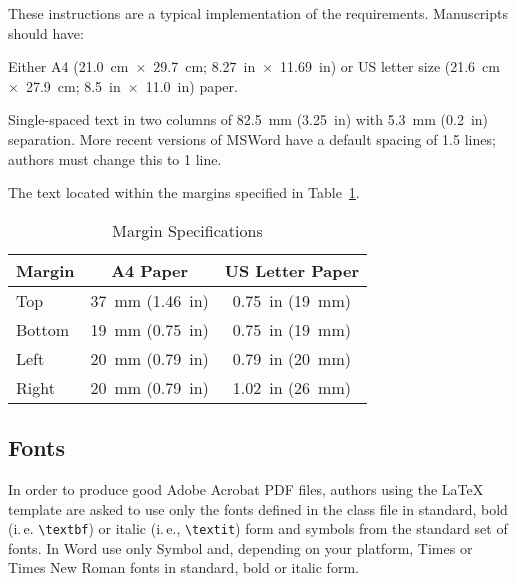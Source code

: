 \documentclass[letterpaper,  %
              ]{jacow-2_3}   %
\begin{document}
{{These instructions are a typical implementation of the
requirements. Manuscripts should have:
\begin{Itemize}
    \item  Either A4 (\SI{21.0}{cm}~$\times$~\SI{29.7}{cm}; \SI{8.27}{in}~$\times$~\SI{11.69}{in}) or US
           letter size (\SI{21.6}{cm}~$\times$~\SI{27.9}{cm}; \SI{8.5}{in}~$\times$~\SI{11.0}{in}) paper.
    \item  Single-spaced text in two columns of \SI{82.5}{mm} (\SI{3.25}{in}) with \SI{5.3}{mm}
           (\SI{0.2}{in}) separation. More recent versions of MSWord have a default spacing of 1.5 lines;
           authors must change this to 1 line.
    \item  The text located within the margins specified in Table~\ref{l2ea4-t1}.
\end{Itemize}
\begin{table}[hbt]
   \centering
   \caption{Margin Specifications}
   \begin{tabular}{lcc}
       \toprule
       \textbf{Margin} & \textbf{A4 Paper}                      & \textbf{US Letter Paper} \\
       \midrule
           Top         & \SI{37}{mm} (\SI{1.46}{in})            & \SI{0.75}{in} (\SI{19}{mm})        \\ %
          Bottom       & \SI{19}{mm} (\SI{0.75}{in})            & \SI{0.75}{in} (\SI{19}{mm})        \\ %
           Left        & \SI{20}{mm} (\SI{0.79}{in})            & \SI{0.79}{in} (\SI{20}{mm})        \\ %
           Right       & \SI{20}{mm} (\SI{0.79}{in})            & \SI{1.02}{in} (\SI{26}{mm})        \\
       \bottomrule
   \end{tabular}
   \label{l2ea4-t1}
\end{table}

\subsection{Fonts}

In order to produce good Adobe Acrobat PDF files, authors
using the LaTeX template are asked to use only the fonts
defined in the class file in standard, bold (i.\,e. \verb|\textbf|)
or italic (i.\,e., \verb|\textit|) form and
symbols from the standard set of fonts. In Word use only
Symbol and, depending on your platform, Times or Times New Roman
fonts in standard, bold or italic form.

}}
\end{document}
